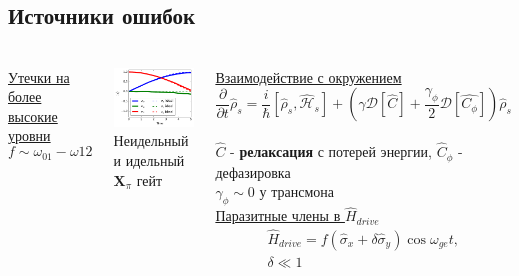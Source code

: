 \documentclass[aspectratio=169, 13pt]{beamer}
\newcommand{\sbrkt}[1]{\left[ #1 \right]}
\begin{document}
\subsection{Источники ошибок}
\begin{frame}[c]\frametitle{\secname}\framesubtitle{\subsecname}
\begin{columns}[c]
\centering
\underline{Утечки на более высокие уровни}
$$ 
f \sim \omega_{01} - \omega{12}
$$

\includegraphics[width = 1 \textwidth]{non_ideal_pi2.pdf}
\vspace{0.1cm}
Неидельный и идельный $\mathbf{X}_{\pi}$ гейт

\centering
\underline{Взаимодействие с окружением}
$$
 \frac{\partial}{\partial t}\hat \rho_s = 
 \frac{i}{\hbar}\sbrkt{\hat \rho_s, \mathcal{\hat H}_s} + \left(\gamma \mathcal{D}\sbrkt{\hat{C}} + \frac{\gamma_\phi}{2} \mathcal{D}\sbrkt{\hat{C_\phi}}  \right) \hat \rho_s
$$
\\
$\hat C$ - \textbf{релаксация} с потерей энергии, 
$\hat C_\phi$ - дефазировка \\
$\gamma_\phi \sim 0$ у трансмона 
\\
\vspace{1cm}
\underline{Паразитные члены в $\hat{H}_{drive}$}
\begin{gather}
\hat{H}_{drive} = f \left(\hat \sigma_x + \delta \hat \sigma_y \right) \cos \omega_{ge} t, \\
\delta \ll 1
\end{gather}
\end{columns}

\end{frame}
\end{document}
